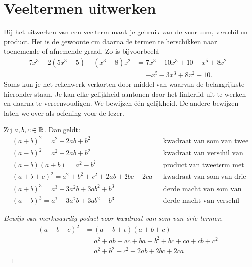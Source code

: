 \documentclass{ximera}
\begin{document}
\section{Veeltermen uitwerken}

Bij het uitwerken van een veelterm maak je gebruik van de  voor som, verschil en product. Het is de gewoonte om daarna de termen te herschikken naar toenemende of afnemende graad. Zo is bijvoorbeeld
\begin{align*}
7x^3-2(5x^3-5)-(x^3-8)x^2 & = 7x^3 - 10x^3 + 10 - x^5 + 8x^2 \\
& = -x^5 - 3x^3 + 8x^2 + 10.
\end{align*}
Soms kun je het rekenwerk verkorten door middel van 
waarvan de belangrijkste hieronder staan. Je kan elke gelijkheid aantonen door het linkerlid uit te werken en daarna te vereenvoudigen. We bewijzen \'e\'en gelijkheid. De andere bewijzen laten we over als oefening voor de lezer. 

\begin{eigenschap}
Zij $a,b,c \in \mathbb{R}$. Dan geldt:
\begin{align*}
& (a+b)^2 = a^2+2ab+b^2 && \text{kwadraat van som van twee termen} \\
& (a-b)^2 = a^2-2ab+b^2 && \text{kwadraat van verschil van twee termen} \\
& (a-b)(a+b) = a^2-b^2 && \text{product van tweeterm met zijn toegevoegde} \\
& (a+b+c)^2 = a^2 + b^2 + c^2 + 2ab + 2bc + 2ca && \text{kwadraat van som van drie termen} \\
& (a+b)^3 = a^3+3a^2b+3ab^2+b^3 && \text{derde macht van som van twee termen} \\
& (a-b)^3 = a^3-3a^2b+3ab^2-b^3 && \text{derde macht van verschil van twee termen.}
\end{align*}
\end{eigenschap} 
\begin{proof}[Bewijs van merkwaardig poduct voor kwadraat van som van drie termen]
\begin{align}
(a+b+c)^2 
& = (a+b+c)(a+b+c) \nonumber \\
& = a^2 + ab + ac + ba + b^2 + bc + ca + cb + c^2 \nonumber \\
& = a^2 + b^2 + c^2 + 2ab + 2bc + 2ca \tag*{\qedhere}
\end{align}
\end{proof}
\end{document}
